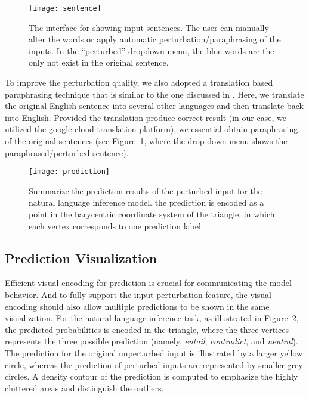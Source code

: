 \begin{figure}[htbp]
\centering
\vspace{-2mm}
 \texttt{[image: sentence]}
 \caption{
The interface for showing input sentences. The user can manually alter the words or apply automatic perturbation/paraphrasing of the inputs. In the ``perturbed'' dropdown menu, the blue words are the only not exist in the original sentence.
 }
 \vspace{-3mm}
\label{fig:sentence}
\end{figure}

To improve the perturbation quality, we also adopted a translation based paraphrasing technique that is similar to the one discussed in \cite{mallinson2017paraphrasing}. Here, we translate the original English sentence into several other languages and then translate back into English. Provided the translation produce correct result (in our case, we utilized the google cloud translation platform), we essential obtain paraphrasing of the original sentences (see Figure~\ref{fig:sentence}, where the drop-down menu shows the paraphrased/perturbed sentence).

\begin{figure}[htbp]
\centering
\vspace{-2mm}
 \texttt{[image: prediction]}
 \caption{
Summarize the prediction results of the perturbed input for the natural language inference model.
the prediction is encoded as a point in the barycentric coordinate system of the triangle, in which each vertex corresponds to one prediction label.
}
\vspace{-3mm}
\label{fig:prediction}
\end{figure}

\subsection{Prediction Visualization}
Efficient visual encoding for prediction is crucial for communicating the model behavior. And to fully support the input perturbation feature, the visual encoding should also allow multiple predictions to be shown in the same visualization.
%
For the natural language inference task, as illustrated in Figure~\ref{fig:prediction}, the predicted probabilities is encoded in the triangle, where the three vertices represents the three possible prediction (namely, \emph{entail}, \emph{contradict}, and \emph{neutral}). The prediction for the original unperturbed input is illustrated by a larger yellow circle, whereas the prediction of perturbed inputs are represented by smaller grey circles.
A density contour of the prediction is computed to emphasize the highly cluttered areas and distinguish the outliers.

